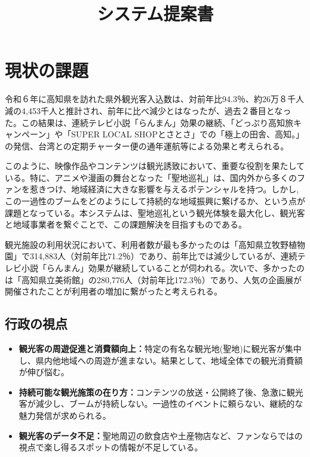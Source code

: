 \documentclass{docs}
\title{システム提案書}
\begin{document}
\section{現状の課題}
令和６年に高知県を訪れた県外観光客入込数は、対前年比94.3％、約26万８千人減の4,453千人と推計され、前年に比べ減少とはなったが、過去２番目となった。この結果は、連続テレビ小説「らんまん」効果の継続、「どっぷり高知旅キャンペーン」や「SUPER LOCAL SHOPとさとさ」での「極上の田舎、高知。」の発信、台湾との定期チャーター便の通年運航等による効果と考えられる。

このように、映像作品やコンテンツは観光誘致において、重要な役割を果たしている。特に、アニメや漫画の舞台となった「聖地巡礼」は、国内外から多くのファンを惹きつけ、地域経済に大きな影響を与えるポテンシャルを持つ。しかし,この一過性のブームをどのようにして持続的な地域振興に繋げるか、という点が課題となっている。本システムは、聖地巡礼という観光体験を最大化し、観光客と地域事業者を繋ぐことで、この課題解決を目指すものである。

観光施設の利用状況において、利用者数が最も多かったのは「高知県立牧野植物園」で314,883人（対前年比71.2％）であり、前年比では減少しているが、連続テレビ小説「らんまん」効果が継続していることが伺われる。次いで、多かったのは「高知県立美術館」の280,776人（対前年比172.3％）であり、人気の企画展が開催されたことが利用者の増加に繋がったと考えられる。

\subsection{行政の視点}
\begin{itemize}
    \item \textbf{観光客の周遊促進と消費額向上：}特定の有名な観光地(聖地)に観光客が集中し、県内他地域への周遊が進まない。結果として、地域全体での観光消費額が伸び悩む。
    \item \textbf{持続可能な観光施策の在り方：}コンテンツの放送・公開終了後、急激に観光客が減少し、ブームが持続しない。一過性のイベントに頼らない、継続的な魅力発信が求められる。
    \item \textbf{観光客のデータ不足：}聖地周辺の飲食店や土産物店など、ファンならではの視点で楽し得るスポットの情報が不足している。
\end{itemize}
\end{document}
